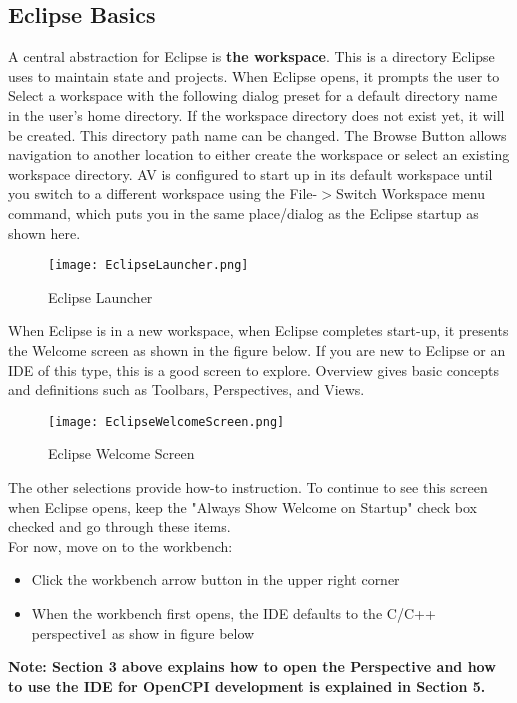 \documentclass[10pt, a4paper, oneside]{article}
\begin{document}
\newpage
\setcounter{secnumdepth}{1} %
\begin{appendices}
\appendix
\section{Eclipse Basics}
A central abstraction for Eclipse is \textbf{the workspace}. This is a directory Eclipse uses to maintain state and projects. When Eclipse opens, it prompts the user to Select a workspace with the following dialog preset for a default directory name in the user’s home directory. If the workspace directory does not exist yet, it will be created. This directory path name can be changed. The Browse Button allows navigation to another location to either create the workspace or select an existing workspace directory.  AV is configured to start up in its default workspace until you switch to a different workspace using the File-$>$Switch Workspace menu command, which puts you in the same place/dialog as the Eclipse startup as shown here.
 \begin{figure}[h!]
	\centering
	\caption{Eclipse Launcher}{}
	\texttt{[image: EclipseLauncher.png]}
 \end{figure}

When Eclipse is in a new workspace, when Eclipse completes start-up, it presents the Welcome screen as shown in the figure below. If you are new to Eclipse or an IDE of this type, this is a good screen to explore. Overview gives basic concepts and definitions such as Toolbars, Perspectives, and Views.
\begin{figure}[h!]
	\centering
	\caption{Eclipse Welcome Screen}{}
	\texttt{[image: EclipseWelcomeScreen.png]}
 \end{figure}
The other selections provide how-to instruction. To continue to see this screen when Eclipse opens, keep the "Always Show Welcome on Startup" check box checked and go through these items. \\

For now, move on to the workbench:
\begin{itemize}
\item Click the workbench arrow button in the upper right corner
\item When the workbench first opens, the IDE defaults to the C/C++ perspective1 as show in figure below
\end{itemize}
 {\textbf {Note: Section 3 above explains how to open the Perspective and how to use the IDE for OpenCPI development is explained in Section 5.}}\\


\end{appendices}
\end{document}
